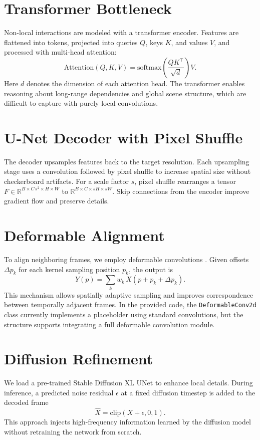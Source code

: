 \documentclass{article}
\begin{document}
\section{Transformer Bottleneck}
Non-local interactions are modeled with a transformer encoder. Features are flattened into tokens, projected into queries $Q$, keys $K$, and values $V$, and processed with multi-head attention:
\begin{equation}
\mathrm{Attention}(Q,K,V) = \mathrm{softmax}\left(\frac{QK^{\top}}{\sqrt{d}}\right)V.
\end{equation}
Here $d$ denotes the dimension of each attention head. The transformer enables reasoning about long-range dependencies and global scene structure, which are difficult to capture with purely local convolutions.

\section{U-Net Decoder with Pixel Shuffle}
The decoder upsamples features back to the target resolution. Each upsampling stage uses a convolution followed by pixel shuffle to increase spatial size without checkerboard artifacts. For a scale factor $s$, pixel shuffle rearranges a tensor $F \in \mathbb{R}^{B\times C\,s^2\times H\times W}$ to $\mathbb{R}^{B\times C\times sH\times sW}$. Skip connections from the encoder improve gradient flow and preserve details.

\section{Deformable Alignment}
To align neighboring frames, we employ deformable convolutions \cite{Dai2017dc}. Given offsets $\Delta p_k$ for each kernel sampling position $p_k$, the output is
\begin{equation}
Y(p) = \sum_{k} w_k\, X(p + p_k + \Delta p_k).
\end{equation}
This mechanism allows spatially adaptive sampling and improves correspondence between temporally adjacent frames. In the provided code, the \texttt{DeformableConv2d} class currently implements a placeholder using standard convolutions, but the structure supports integrating a full deformable convolution module.

\section{Diffusion Refinement}
We load a pre-trained Stable Diffusion XL UNet \cite{Rombach2022} to enhance local details. During inference, a predicted noise residual $\epsilon$ at a fixed diffusion timestep is added to the decoded frame
\begin{equation}
\hat{X} = \mathrm{clip}(X + \epsilon, 0, 1).
\end{equation}
This approach injects high-frequency information learned by the diffusion model without retraining the network from scratch.
\end{document}
